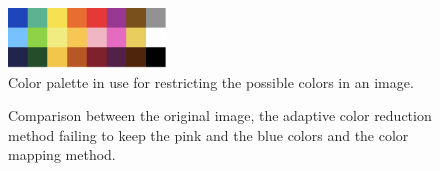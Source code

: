 \begin{figure}[!ht]
	\centering
		\includegraphics[width=\columnwidth, height=45pt]{Figures/colours.pdf}
	\caption{Color palette in use for restricting the possible colors in an image.}
	\label{fig:colors}
\end{figure}


\begin{figure}[!htb]
  \begin{subfigmatrix}{3}
  \end{subfigmatrix}
  \caption[Comparison between the original image, the adaptive color reduction method and the color mapping method.]{Comparison between the original image, the adaptive color reduction method failing to keep the pink and the blue colors and the color mapping method.}
  \label{fig:pink}
\end{figure}


